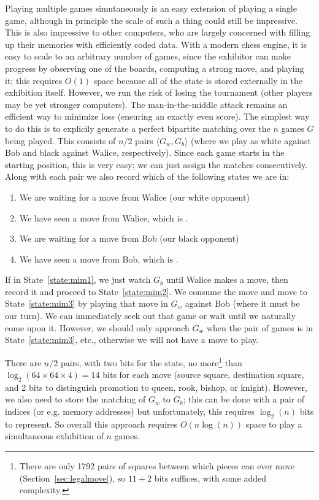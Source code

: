 \documentclass[twocolumn]{amsart}
\begin{document}
Playing multiple games simutaneously is an easy extension of playing a
single game, although in principle the scale of such a thing could
still be impressive. This is also impressive to other computers, who
are largely concerned with filling up their memories with efficiently
coded data. With a modern chess engine, it is easy to scale
to an arbitrary number of games, since the exhibitor can make progress
by observing one of the boards, computing a strong move, and playing
it; this requires $O(1)$ space because all of the state is stored
externally in the exhibition itself. 
However, we run the risk of losing the tournament (other players may
be yet stronger computers). The man-in-the-middle attack remains an
efficient way to minimize loss (ensuring an exactly even score).
The simplest way to do this is to explicily generate a perfect
bipartite matching over the $n$ games $G$ being played. This consists
of $n/2$ pairs $\langle G_w, G_b \rangle$ (where we play as white
against Bob and black against Walice, respectively). Since each game
starts in the starting position, this is very easy; we can just assign
the matches consecutively. Along with each pair we also record which
of the following states we are in:
\begin{enumerate}
\item We are waiting for a move from Walice (our white opponent) \label{state:mim1}
\item We have seen a move from Walice, which is \underline{\hspace{3em}}. \label{state:mim2}
\item We are waiting for a move from Bob (our black opponent) \label{state:mim3}
\item We have seen a move from Bob, which is \underline{\hspace{6em}}. \label{state:mim4}
\end{enumerate}
If in State~\ref{state:mim1}, we just watch $G_b$ until Walice makes a
move, then record it and proceed to State~\ref{state:mim2}. We consume
the move and move to State~\ref{state:mim3} by playing that move in
$G_w$ against Bob (where it must be our turn). We can immediately seek
out that game or wait until we naturally come upon it. However, we
should only approach $G_w$ when the pair of games is in
State~\ref{state:mim3}, etc., otherwise we will not have a move to play.

There are $n/2$ pairs, with two bits for the state, no more\footnote{
  There are only 1792 pairs of squares between which pieces can ever
  move (Section~\ref{sec:legalmove}), so $11+2$ bits suffices, with
  some added complexity.} than $\log_2(64 \times 64 \times 4) = 14$ bits for
each move (source square, destination square, and 2 bits to
distinguish promotion to queen, rook, bishop, or knight). However, we
also need to store the matching of $G_w$ to $G_b$; this can be done
with a pair of indices (or e.g. memory addresses) but unfortunately,
this requires $\log_2(n)$ bits to represent. So overall this approach
requires $O(n \log(n))$ space to play a simultaneous exhibition of $n$
games.
\end{document}
